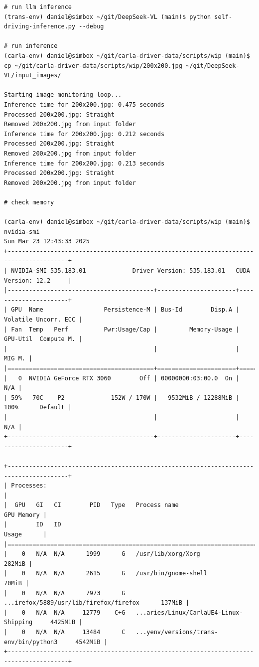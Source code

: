 \begin{verbatim}
# run llm inference
(trans-env) daniel@simbox ~/git/DeepSeek-VL (main)$ python self-driving-inference.py --debug

# run inference 
(carla-env) daniel@simbox ~/git/carla-driver-data/scripts/wip (main)$ cp ~/git/carla-driver-data/scripts/wip/200x200.jpg ~/git/DeepSeek-VL/input_images/

Starting image monitoring loop...
Inference time for 200x200.jpg: 0.475 seconds
Processed 200x200.jpg: Straight
Removed 200x200.jpg from input folder
Inference time for 200x200.jpg: 0.212 seconds
Processed 200x200.jpg: Straight
Removed 200x200.jpg from input folder
Inference time for 200x200.jpg: 0.213 seconds
Processed 200x200.jpg: Straight
Removed 200x200.jpg from input folder

# check memory

(carla-env) daniel@simbox ~/git/carla-driver-data/scripts/wip (main)$ nvidia-smi
Sun Mar 23 12:43:33 2025       
+---------------------------------------------------------------------------------------+
| NVIDIA-SMI 535.183.01             Driver Version: 535.183.01   CUDA Version: 12.2     |
|-----------------------------------------+----------------------+----------------------+
| GPU  Name                 Persistence-M | Bus-Id        Disp.A | Volatile Uncorr. ECC |
| Fan  Temp   Perf          Pwr:Usage/Cap |         Memory-Usage | GPU-Util  Compute M. |
|                                         |                      |               MIG M. |
|=========================================+======================+======================|
|   0  NVIDIA GeForce RTX 3060        Off | 00000000:03:00.0  On |                  N/A |
| 59%   70C    P2             152W / 170W |   9532MiB / 12288MiB |    100%      Default |
|                                         |                      |                  N/A |
+-----------------------------------------+----------------------+----------------------+
                                                                                         
+---------------------------------------------------------------------------------------+
| Processes:                                                                            |
|  GPU   GI   CI        PID   Type   Process name                            GPU Memory |
|        ID   ID                                                             Usage      |
|=======================================================================================|
|    0   N/A  N/A      1999      G   /usr/lib/xorg/Xorg                          282MiB |
|    0   N/A  N/A      2615      G   /usr/bin/gnome-shell                         70MiB |
|    0   N/A  N/A      7973      G   ...irefox/5889/usr/lib/firefox/firefox      137MiB |
|    0   N/A  N/A     12779    C+G   ...aries/Linux/CarlaUE4-Linux-Shipping     4425MiB |
|    0   N/A  N/A     13484      C   ...yenv/versions/trans-env/bin/python3     4542MiB |
+---------------------------------------------------------------------------------------+


\end{verbatim}
